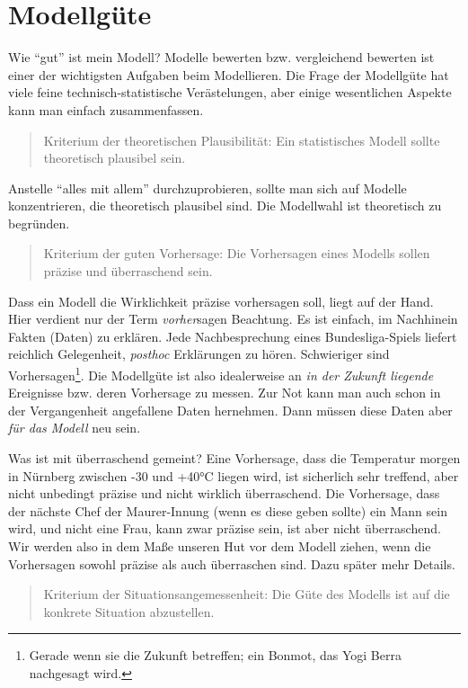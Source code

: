 \documentclass[12pt,ngerman,]{book}
\let\rmarkdownfootnote\footnote%
\def\footnote{\protect\rmarkdownfootnote}
\theoremstyle{definition}
\theoremstyle{definition}
\theoremstyle{remark}
\begin{document}
\section{Modellgüte}\label{modellgute}

Wie ``gut'' ist mein Modell? Modelle bewerten bzw. vergleichend bewerten
ist einer der wichtigsten Aufgaben beim Modellieren. Die Frage der
Modellgüte hat viele feine technisch-statistische Verästelungen, aber
einige wesentlichen Aspekte kann man einfach zusammenfassen.

\begin{quote}
Kriterium der theoretischen Plausibilität: Ein statistisches Modell
sollte theoretisch plausibel sein.
\end{quote}

Anstelle ``alles mit allem'' durchzuprobieren, sollte man sich auf
Modelle konzentrieren, die theoretisch plausibel sind. Die Modellwahl
ist theoretisch zu begründen.

\begin{quote}
Kriterium der guten Vorhersage: Die Vorhersagen eines Modells sollen
präzise und überraschend sein.
\end{quote}

Dass ein Modell die Wirklichkeit präzise vorhersagen soll, liegt auf der
Hand. Hier verdient nur der Term \emph{vorher}sagen Beachtung. Es ist
einfach, im Nachhinein Fakten (Daten) zu erklären. Jede Nachbesprechung
eines Bundesliga-Spiels liefert reichlich Gelegenheit, \emph{posthoc}
Erklärungen zu hören. Schwieriger sind Vorhersagen\footnote{Gerade wenn
  sie die Zukunft betreffen; ein Bonmot, das Yogi Berra nachgesagt wird.}.
Die Modellgüte ist also idealerweise an \emph{in der Zukunft liegende}
Ereignisse bzw. deren Vorhersage zu messen. Zur Not kann man auch schon
in der Vergangenheit angefallene Daten hernehmen. Dann müssen diese
Daten aber \emph{für das Modell} neu sein.

Was ist mit überraschend gemeint? Eine Vorhersage, dass die Temperatur
morgen in Nürnberg zwischen -30 und +40°C liegen wird, ist sicherlich
sehr treffend, aber nicht unbedingt präzise und nicht wirklich
überraschend. Die Vorhersage, dass der nächste Chef der Maurer-Innung
(wenn es diese geben sollte) ein Mann sein wird, und nicht eine Frau,
kann zwar präzise sein, ist aber nicht überraschend. Wir werden also in
dem Maße unseren Hut vor dem Modell ziehen, wenn die Vorhersagen sowohl
präzise als auch überraschen sind. Dazu später mehr Details.

\begin{quote}
Kriterium der Situationsangemessenheit: Die Güte des Modells ist auf die
konkrete Situation abzustellen.
\end{quote}
\end{document}
